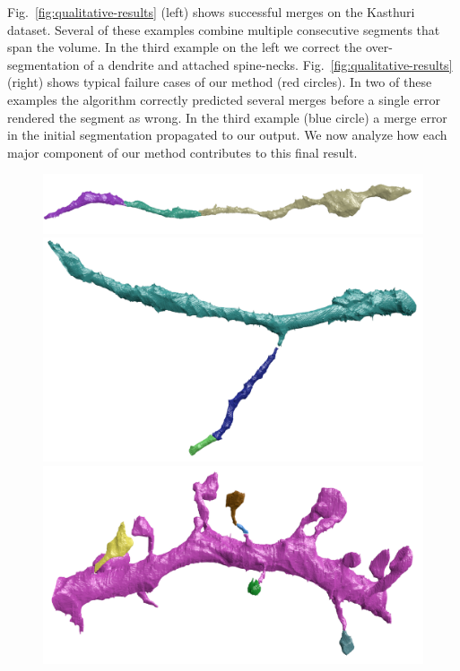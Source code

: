 Fig.~\ref{fig:qualitative-results} (left) shows successful merges on the Kasthuri dataset. 
Several of these examples combine multiple consecutive segments that span the volume.
In the third example on the left we correct the over-segmentation of a dendrite and attached spine-necks.
Fig.~\ref{fig:qualitative-results} (right) shows typical failure cases of our method (red circles).
In two of these examples the algorithm correctly predicted several merges before a single error rendered the segment as wrong.
In the third example (blue circle) a merge error in the initial segmentation propagated to our output.
We now analyze how each major component of our method contributes to this final result.

\begin{figure}[t]
	\begin{minipage}{0.45\linewidth}
		\centering
		\includegraphics[width=0.85\linewidth]{./figures/VI-results/multicut-correct1.png}
		\includegraphics[width=0.85\linewidth]{./figures/VI-results/multicut-correct2.png}
		\includegraphics[width=0.85\linewidth]{./figures/VI-results/multicut-correct3.png}

\end{minipage}
\end{figure}
